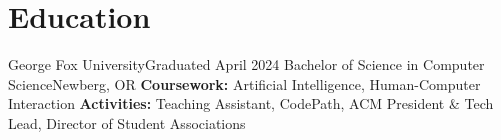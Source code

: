 \section{Education}
  \resumeSubHeadingListStart
    \resumeEducationSubheading
        {George Fox University}{Graduated April 2024}
        {Bachelor of Science in Computer Science}{Newberg, OR}
        {\textbf{Coursework:} Artificial Intelligence, Human-Computer Interaction}
        {\textbf{Activities:} Teaching Assistant, CodePath, ACM President \& Tech Lead, Director of Student Associations}
  \resumeSubHeadingListEnd


